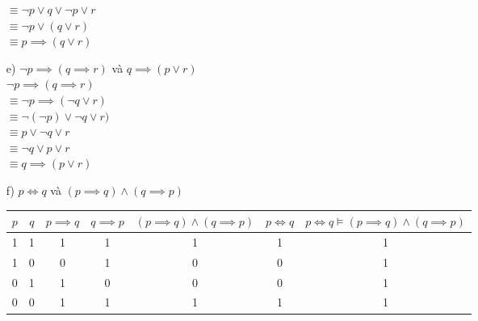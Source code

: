 \documentclass[a4paper]{article}
\begin{document}
\begin{enumerate}
		 			$\equiv  \lnot p \lor q \lor \lnot p \lor r$\\
		 			$\equiv  \lnot p \lor (q \lor r)$\\ $\equiv  p \implies (q \lor r)$\\
		 \item[e)]	$\lnot p \implies (q \implies r) $ và $ q \implies (p \lor r)$\\
		 			$\lnot p \implies (q \implies r)$\\
		 			$\equiv  \lnot p \implies (\lnot q \lor r)$\\
		 			$\equiv  \lnot (\lnot p) \lor \lnot q \lor r)$\\
		 			$\equiv p \lor \lnot q \lor r$\\
		 			$\equiv  \lnot q \lor p \lor r $\\
		 			$\equiv  q \implies (p \lor r)$\\
		 \item[f)] $p \iff q $ và $ (p \implies q) \land (q \implies p)$
		 	\begin{table} [h]
		 		\centering
		 		\begin{tabular} {|c|c|c|c|c|c|c|}
		 			\hline
		 			$p$&$q$&$p \implies q$&$q \implies p$&$(p \implies q) \land (q \implies p)$ &$p \iff q$ &$p \iff q \vDash (p \implies q) \land (q \implies p)$\\
		 			\hline
		 			1&1&1&1&1&1&1\\
		 			1&0&0&1&0&0&1\\
		 			0&1&1&0&0&0&1\\
		 			0&0&1&1&1&1&1\\
		 			\hline
		 		\end{tabular}
		 	\end{table}
	\end{enumerate}
\clearpage
\end{document}
